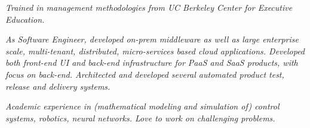 

{\selectfont
	\begin{justify}\textit{Trained in management methodologies from UC Berkeley Center for Executive Education.}\end{justify}
}
{\selectfont
	\begin{justify}\textit{As Software Engineer, developed on-prem middleware as well as large enterprise scale, multi-tenant, distributed, micro-services based cloud applications. Developed both front-end UI and back-end infrastructure for PaaS and SaaS products, with focus on back-end. Architected and developed several automated product test, release and delivery systems.}\end{justify}
}

{\selectfont
	\begin{justify}\textit{Academic experience in (mathematical modeling and simulation of) control systems, robotics, neural networks. Love to work on challenging problems.}\end{justify}
}